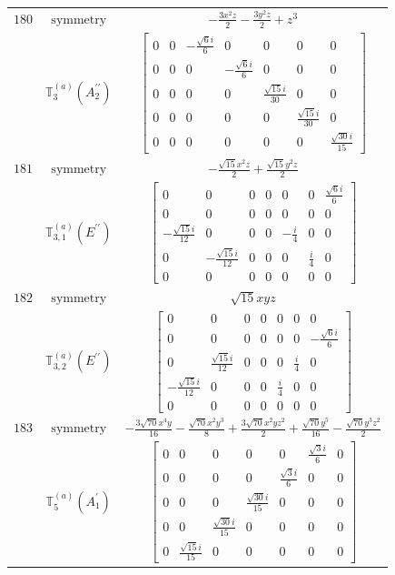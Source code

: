 \documentclass[fleqn,8pt,landscape]{jsarticle}
\begin{document}
\begin{longtable}{ccc}
$ 180 $ & $ \text{symmetry} $ & $ - \frac{3 x^{2} z}{2} - \frac{3 y^{2} z}{2} + z^{3} $ \\
$  $ & $ \mathbb{T}_{3}^{(a)}(A_{2}^{\prime\prime}) $ & $ \begin{bmatrix} 0 & 0 & - \frac{\sqrt{6} i}{6} & 0 & 0 & 0 & 0 \\ 0 & 0 & 0 & - \frac{\sqrt{6} i}{6} & 0 & 0 & 0 \\ 0 & 0 & 0 & 0 & \frac{\sqrt{15} i}{30} & 0 & 0 \\ 0 & 0 & 0 & 0 & 0 & \frac{\sqrt{15} i}{30} & 0 \\ 0 & 0 & 0 & 0 & 0 & 0 & \frac{\sqrt{30} i}{15} \end{bmatrix} $ \\ \hline
$ 181 $ & $ \text{symmetry} $ & $ - \frac{\sqrt{15} x^{2} z}{2} + \frac{\sqrt{15} y^{2} z}{2} $ \\
$  $ & $ \mathbb{T}_{3,1}^{(a)}(E^{\prime\prime}) $ & $ \begin{bmatrix} 0 & 0 & 0 & 0 & 0 & 0 & \frac{\sqrt{6} i}{6} \\ 0 & 0 & 0 & 0 & 0 & 0 & 0 \\ - \frac{\sqrt{15} i}{12} & 0 & 0 & 0 & - \frac{i}{4} & 0 & 0 \\ 0 & - \frac{\sqrt{15} i}{12} & 0 & 0 & 0 & \frac{i}{4} & 0 \\ 0 & 0 & 0 & 0 & 0 & 0 & 0 \end{bmatrix} $ \\ \hline
$ 182 $ & $ \text{symmetry} $ & $ \sqrt{15} x y z $ \\
$  $ & $ \mathbb{T}_{3,2}^{(a)}(E^{\prime\prime}) $ & $ \begin{bmatrix} 0 & 0 & 0 & 0 & 0 & 0 & 0 \\ 0 & 0 & 0 & 0 & 0 & 0 & - \frac{\sqrt{6} i}{6} \\ 0 & \frac{\sqrt{15} i}{12} & 0 & 0 & 0 & \frac{i}{4} & 0 \\ - \frac{\sqrt{15} i}{12} & 0 & 0 & 0 & \frac{i}{4} & 0 & 0 \\ 0 & 0 & 0 & 0 & 0 & 0 & 0 \end{bmatrix} $ \\ \hline
$ 183 $ & $ \text{symmetry} $ & $ - \frac{3 \sqrt{70} x^{4} y}{16} - \frac{\sqrt{70} x^{2} y^{3}}{8} + \frac{3 \sqrt{70} x^{2} y z^{2}}{2} + \frac{\sqrt{70} y^{5}}{16} - \frac{\sqrt{70} y^{3} z^{2}}{2} $ \\
$  $ & $ \mathbb{T}_{5}^{(a)}(A_{1}^{\prime}) $ & $ \begin{bmatrix} 0 & 0 & 0 & 0 & 0 & \frac{\sqrt{3} i}{6} & 0 \\ 0 & 0 & 0 & 0 & \frac{\sqrt{3} i}{6} & 0 & 0 \\ 0 & 0 & 0 & \frac{\sqrt{30} i}{15} & 0 & 0 & 0 \\ 0 & 0 & \frac{\sqrt{30} i}{15} & 0 & 0 & 0 & 0 \\ 0 & \frac{\sqrt{15} i}{15} & 0 & 0 & 0 & 0 & 0 \end{bmatrix} $ \\ \hline

\end{longtable}
\end{document}
